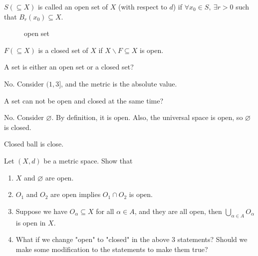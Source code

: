 \begin{prev}
    \(S (\subseteq X)\) is called an open set of \(X\) (with respect to \(d\)) if \(\forall x_0 \in S, \ \exists r>0\) such that \(B_r(x_0) \subseteq X\).   
\end{prev}
\begin{figure}[H]
    \centering
    \caption{open set}
    \label{fig:openSet}
\end{figure}
\begin{prev}
    \(F (\subseteq X)\) is a closed set of \(X\) if \(X \backslash F \subseteq X\) is open. 
\end{prev}

\begin{eg}
    A set is either an open set or a closed set?
\end{eg}
\begin{explanation}
    No. Consider \((1,3]\), and the metric is the absolute value. 
\end{explanation}
\begin{eg}
    A set can not be open and closed at the same time?
\end{eg}
\begin{explanation}
No. Consider \(\varnothing \). By definition, it is open. Also, the universal space is open, so \(\varnothing \) is closed. 
\end{explanation}

\begin{note}
    Closed ball is close.
\end{note}
\begin{explanation}
    
\end{explanation}

\begin{exercise}
    Let \((X,d)\) be a metric space. Show that
    \begin{enumerate}
        \item \(X\) and \(\varnothing \) are open. 
        \item \(O_1\) and \(O_2\) are open implies \(O_1 \cap O_2\) is open.
        \item Suppose we have \(O_\alpha \subseteq X\) for all \(\alpha  \in A\), and they are all open, then \(\bigcup_{\alpha \in A} O_\alpha  \) is open in \(X\).
        \item What if we change "open" to "closed" in the above 3 statements? Should we make some modification to the statements to make them true?         
    \end{enumerate} 
\end{exercise}

